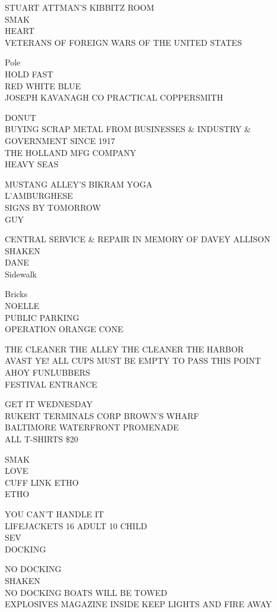 \documentclass[10pt,letterpaper]{article}
\begin{document}
STUART ATTMAN'S KIBBITZ ROOM\\
SMAK\\
HEART\\
VETERANS OF FOREIGN WARS OF THE UNITED STATES

Pole\\
HOLD FAST\\
RED WHITE BLUE\\
JOSEPH KAVANAGH CO PRACTICAL COPPERSMITH

DONUT\\
BUYING SCRAP METAL FROM BUSINESSES \& INDUSTRY \& GOVERNMENT SINCE 1917\\
THE HOLLAND MFG COMPANY\\
HEAVY SEAS

MUSTANG ALLEY'S BIKRAM YOGA\\
L'AMBURGHESE\\
SIGNS BY TOMORROW\\
GUY

CENTRAL SERVICE \& REPAIR IN MEMORY OF DAVEY ALLISON\\
SHAKEN\\
DANE\\
Sidewalk

Bricks\\
NOELLE\\
PUBLIC PARKING\\
OPERATION ORANGE CONE

THE CLEANER THE ALLEY THE CLEANER THE HARBOR\\
AVAST YE! ALL CUPS MUST BE EMPTY TO PASS THIS POINT\\
AHOY FUNLUBBERS\\
FESTIVAL ENTRANCE

GET IT WEDNESDAY\\
RUKERT TERMINALS CORP BROWN'S WHARF\\
BALTIMORE WATERFRONT PROMENADE\\
ALL T{-}SHIRTS \$20

SMAK\\
LOVE\\
CUFF LINK ETHO\\
ETHO

YOU CAN'T HANDLE IT\\
LIFEJACKETS 16 ADULT 10 CHILD\\
SEV\\
DOCKING

NO DOCKING\\
SHAKEN\\
NO DOCKING BOATS WILL BE TOWED\\
EXPLOSIVES MAGAZINE INSIDE KEEP LIGHTS AND FIRE AWAY
\end{document}
